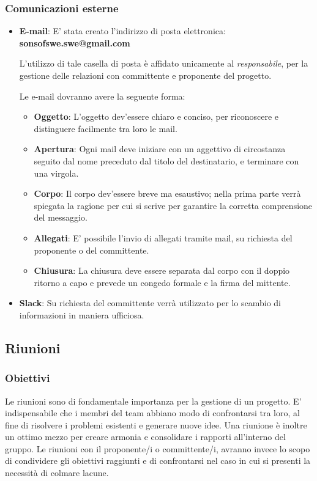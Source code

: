 \subsubsection{Comunicazioni esterne}
\begin{itemize}
\item\textbf{E-mail}: E' stata creato l'indirizzo di posta elettronica:
\textbf{sonsofswe.swe@gmail.com}

L'utilizzo di tale casella di posta è affidato unicamente al \textit{responsabile}, per la gestione delle relazioni con committente e proponente del progetto.

Le e-mail dovranno avere la seguente forma:
\begin{itemize}
\item\textbf{Oggetto}: L'oggetto dev'essere chiaro e conciso, per riconoscere e distinguere facilmente tra loro le mail.
\item\textbf{Apertura}: Ogni mail deve iniziare con un aggettivo di circostanza seguito dal nome preceduto dal titolo del destinatario, e terminare con una virgola.
\item\textbf{Corpo}: Il corpo dev'essere breve ma esaustivo; nella prima parte verrà spiegata la ragione per cui si scrive per garantire la corretta comprensione del messaggio. 
\item\textbf{Allegati}: E' possibile l'invio di allegati tramite mail, su richiesta del proponente o del committente.
\item\textbf{Chiusura}: La chiusura deve essere separata dal corpo con il doppio ritorno a capo e prevede un congedo formale e la firma del mittente.
\end{itemize}

\item\textbf{Slack}: Su richiesta del committente verrà utilizzato per lo scambio di informazioni in maniera ufficiosa.
\end{itemize}

\subsection{Riunioni}
\subsubsection{Obiettivi}
Le riunioni sono di fondamentale importanza per la gestione di un progetto. E' indispensabile che i membri del team abbiano
modo di confrontarsi tra loro, al fine di risolvere i problemi esistenti e generare nuove idee. Una riunione è inoltre un
ottimo mezzo per creare armonia e consolidare i rapporti all'interno del gruppo. Le riunioni con il proponente/i o committente/i, avranno invece lo scopo di condividere gli obiettivi raggiunti e di confrontarsi nel caso in cui si presenti
la necessità di colmare lacune. 
